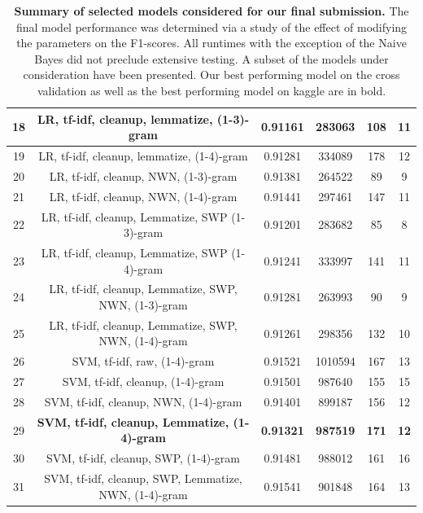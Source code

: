 \documentclass{amsart}
\theoremstyle{definition}
\theoremstyle{remark}
\numberwithin{equation}{section}
\begin{document}
\begin{center}
\begin{table}
\begin{tabular}{|| c | c | c | c | c | c ||}
			\hline
			18 & LR, tf-idf, cleanup, lemmatize, (1-3)-gram & 0.91161 & 283063 & 108 & 11\\
			\hline
			19 & LR, tf-idf, cleanup, lemmatize, (1-4)-gram & 0.91281 & 334089 & 178 & 12 \\
			\hline
			20 & LR, tf-idf, cleanup, NWN, (1-3)-gram & 0.91381 & 264522 & 89 & 9\\
			\hline
			21 & LR, tf-idf, cleanup, NWN, (1-4)-gram & 0.91441 & 297461 & 147 & 11\\
			\hline
			22 & LR, tf-idf, cleanup, Lemmatize, SWP (1-3)-gram & 0.91201 & 283682 & 85 & 8 \\
			\hline
			23 & LR, tf-idf, cleanup, Lemmatize, SWP (1-4)-gram & 0.91241 & 333997 & 141 & 11\\
			\hline
			24 & LR, tf-idf, cleanup, Lemmatize, SWP, NWN, (1-3)-gram & 0.91281 & 263993 & 90 & 9 \\
			\hline
			25 & LR, tf-idf, cleanup, Lemmatize, SWP, NWN, (1-4)-gram & 0.91261 & 298356 & 132 & 10\\
			\hline
			26 & SVM, tf-idf, raw, (1-4)-gram & 0.91521 & 1010594 & 167 & 13 \\
			\hline
			27 & SVM, tf-idf, cleanup, (1-4)-gram & 0.91501 & 987640 & 155 & 15 \\
			\hline
			28 & SVM, tf-idf, cleanup, NWN, (1-4)-gram & 0.91401 & 899187 & 156 & 12\\
			\hline
			29 & \textbf{SVM, tf-idf, cleanup, Lemmatize, (1-4)-gram} & \textbf{0.91321} & \textbf{987519} & \textbf{171} & \textbf{12}\\
			\hline
			30 & SVM, tf-idf, cleanup, SWP, (1-4)-gram & 0.91481 & 988012 & 161 & 16\\
			\hline
			31 & SVM, tf-idf, cleanup, SWP, Lemmatize, NWN, (1-4)-gram & 0.91541 & 901848 & 164 & 13\\
			\hline\hline
		\end{tabular}
		\caption*{\textbf{Summary of selected models considered for our final submission.} The final model performance was determined via a study of the effect of modifying the parameters on the F1-scores.  All runtimes with the exception of the Naive Bayes did not preclude extensive testing.  A subset of the models under consideration have been presented.  Our best performing model on the cross validation as well as the best performing model on kaggle are in bold.}
	\end{table}
\end{center}
\end{document}

